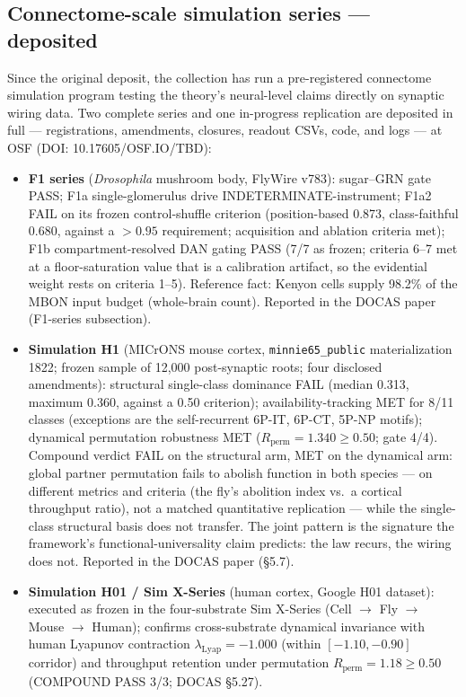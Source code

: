\documentclass[11pt]{article}
\begin{document}
\subsection*{Connectome-scale simulation series --- deposited}

Since the original deposit, the collection has run a pre-registered
connectome simulation program testing the theory's neural-level claims
directly on synaptic wiring data. Two complete series and one in-progress
replication are deposited in full --- registrations, amendments, closures,
readout CSVs, code, and logs --- at OSF (DOI: 10.17605/OSF.IO/TBD):

\begin{itemize}
\item \textbf{F1 series} (\emph{Drosophila} mushroom body, FlyWire v783):
sugar--GRN gate PASS; F1a single-glomerulus drive INDETERMINATE-instrument;
F1a2 FAIL on its frozen control-shuffle criterion (position-based 0.873,
class-faithful 0.680, against a $>0.95$ requirement; acquisition and
ablation criteria met); F1b compartment-resolved DAN gating PASS (7/7 as
frozen; criteria 6--7 met at a floor-saturation value that is a calibration
artifact, so the evidential weight rests on criteria 1--5).
Reference fact: Kenyon cells supply 98.2\% of the MBON input budget
(whole-brain count). Reported in the DOCAS paper (F1-series subsection).
\item \textbf{Simulation H1} (MICrONS mouse cortex, \texttt{minnie65\_public}
materialization 1822; frozen sample of 12{,}000 post-synaptic roots; four
disclosed amendments): structural single-class dominance FAIL (median 0.313,
maximum 0.360, against a 0.50 criterion); availability-tracking MET for
8/11 classes (exceptions are the self-recurrent 6P-IT, 6P-CT, 5P-NP motifs);
dynamical permutation robustness MET ($R_{\mathrm{perm}} = 1.340 \geq 0.50$;
gate 4/4). Compound verdict FAIL on the structural arm, MET on the dynamical arm:
global partner permutation fails to abolish function in both species ---
on different metrics and criteria (the fly's abolition index vs.\ a
cortical throughput ratio), not a matched quantitative replication ---
while the single-class structural basis does not transfer. The joint
pattern is the signature the framework's functional-universality claim
predicts: the law recurs, the wiring does not. Reported in the DOCAS
paper (\S{}5.7).
\item \textbf{Simulation H01 / Sim X-Series} (human cortex, Google H01 dataset): executed as frozen in the four-substrate Sim X-Series (Cell $\to$ Fly $\to$ Mouse $\to$ Human); confirms cross-substrate dynamical invariance with human Lyapunov contraction $\lambda_{\mathrm{Lyap}} = -1.000$ (within $[-1.10, -0.90]$ corridor) and throughput retention under permutation $R_{\mathrm{perm}} = 1.18 \ge 0.50$ (COMPOUND PASS 3/3; DOCAS \S{}5.27).
\end{itemize}
\end{document}
